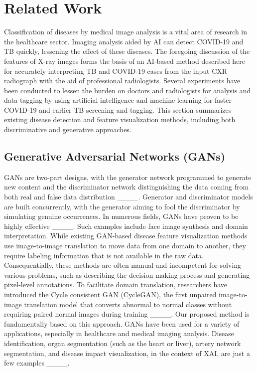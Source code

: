 \section{Related Work}
{Classification of diseases by medical image analysis is a vital area of research in the healthcare sector. Imaging analysis aided by AI can detect COVID-19 and TB quickly, lessening the effect of these diseases. The foregoing discussion of the features of X-ray images forms the basis of an AI-based method described here for accurately interpreting TB and COVID-19 cases from the input CXR radiograph with the aid of professional radiologists. Several experiments have been conducted to lessen the burden on doctors and radiologists for analysis and data tagging by using artificial intelligence and machine learning for faster COVID-19 and earlier TB screening and tagging. This section summarizes existing disease detection and feature visualization methods, including both discriminative and generative approaches.}

\subsection{Generative Adversarial Networks (GANs)}
{
GANs are two-part designs, with the generator network programmed to generate new content and the discriminator network distinguishing the data coming from both real and false data distribution ____. Generator and discriminator models are built concurrently, with the generator aiming to fool the discriminator by simulating genuine occurrences. In numerous fields, GANs have proven to be highly effective ____. Such examples include face image synthesis and domain interpretation. While existing GAN-based disease feature visualization methods use image-to-image translation to move data from one domain to another, they require labeling information that is not available in the raw data. Consequentially, these methods are often manual and incompetent for solving various problems, such as describing the decision-making process and generating pixel-level annotations. To facilitate domain translation, researchers have introduced the Cycle consistent GAN (CycleGAN), the first unpaired image-to-image translation model that converts abnormal to normal classes without requiring paired normal images during training ____. Our proposed method is fundamentally based on this approach. GANs have been used for a variety of applications, especially in healthcare and medical imaging analysis. Disease identification, organ segmentation (such as the heart or liver), artery network segmentation, and disease impact visualization, in the context of XAI, are just a few examples ____.
}

